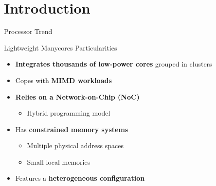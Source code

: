 \section{Introduction}



	\begin{frame}{Processor Trend}
		\begin{overprint}
		\end{overprint}
	\end{frame}

	\begin{frame}[fragile]{Lightweight Manycores Particularities}
		\begin{itemize}
			\item \textbf{Integrates thousands of low-power cores} grouped in clusters
			\item Copes with \textbf{MIMD workloads}
			\item \textbf{Relies on a Network-on-Chip (NoC)} %
			\begin{itemize}
				\item Hybrid programming model
			\end{itemize}
			\item Has \textbf{constrained memory systems}
			\begin{itemize}
				\item Multiple physical address spaces
				\item Small local memories
			\end{itemize}
			\item Features a \textbf{heterogeneous configuration}
		\end{itemize}
	\end{frame}

